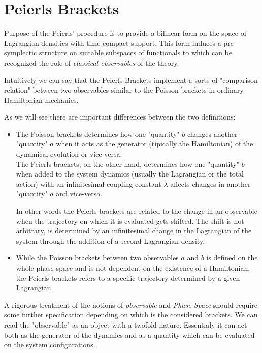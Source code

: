 \documentclass[Main]{subfiles}
\begin{document}
	\section{Peierls Brackets}
		Purpose of the Peierls' procedure is to provide a bilinear form on the space of Lagrangian densities with time-compact support.
		This form induces a pre-symplectic structure on suitable subspaces of functionals to which can be recognized the role of \emph{classical observables}  of the theory.	
	
	\begin{observation}
		Intuitively we can say that the Peierls Brackets implement a sorts of "comparison relation" between two observables similar to the Poisson brackets in ordinary Hamiltonian mechanics.
		
		As we will see there are important differences between the two definitions:
		\begin{itemize}
			\item The Poisson brackets determines how one "quantity" $b$ changes another "quantity" $a$ when it acts as the  generator (tipically the  Hamiltonian) of the dynamical evolution or vice-versa. \cite{Sharan2010}
	\\	
	The Peierls brackets, on the other hand, determines how one "quantity" $b$  when added to the system dynamics (usually the Lagrangian or the total action)  with an infinitesimal coupling constant $\lambda$ affects changes in another "quantity" $a$ and vice-versa.
	
	In other words the Peierls brackets are related to the change in an observable when the trajectory on which it is evaluated gets shifted.
	The shift is not arbitrary, is determined by an infinitesimal change in the Lagrangian of the system through the addition of a second Lagrangian density.
	
			\item While the Poisson brackets between two observables $a$ and $b$ is defined on the whole phase space and is not dependent on the existence of a Hamiltonian, the Peierls brackets refers to a specific trajectory determined by a given Lagrangian. 
		\end{itemize}
		A rigorous treatment of the notions of \emph{observable} and \emph{Phase Space} should require some further specification depending on which is the  considered brackets.		
		We can read the "observable" as an object with a twofold nature. Essentialy it can act both as the generator of the dynamics and as a quantity which can be evaluated on the system configurations.
	\end{observation}	
	
\end{document}
